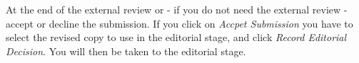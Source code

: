 At the end of the external review or - if you do not need the external review - accept or decline the submission. If you click on \textit{Accpet Submission} you have to select the revised copy to use in the editorial stage, and click \textit{Record Editorial Decision}. You will then be taken to the editorial stage.










